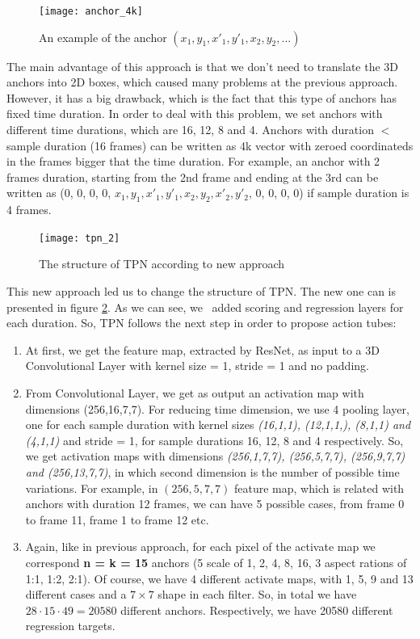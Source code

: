 \begin{figure}[h]
  \centering
  \texttt{[image: anchor\_4k]}
  \caption{An example of the anchor $(x_1,y_1,x'_1,y'_1,x_2,y_2, ...)$}
  \label{fig:anchor_4k}
\end{figure}

The main advantage of this approach is that we don't need to translate the 3D anchors into 2D boxes, which caused many problems at the previous approach.
However, it has a big drawback, which is the fact that this type of anchors has fixed time duration.
In order to deal with this problem, we set anchors with different time durations, which are 16, 12, 8 and 4.
Anchors with duration $ < $ sample duration (16 frames) can be written as 4k vector with zeroed coordinateds in the frames bigger that the time duration. For example, an anchor with
2 frames duration, starting from the 2nd frame and ending at the 3rd can be written as (0, 0, 0, 0, $x_1, y_1, x'_1, y'_1, x_2, y_2, x'_2, y'_2$, 0, 0, 0, 0) if sample
duration is 4 frames. 

\begin{figure}[h]
  \centering
  \texttt{[image: tpn\_2]}
  \caption{The structure of TPN according to new approach}
  \label{fig:New_structure}
\end{figure}

This new approach led us to change the structure of TPN. The new one can is presented in figure \ref{fig:New_structure}. As we can see, we \
added scoring and regression layers for each duration. So, TPN follows the next step in order to propose action tubes:
\begin{enumerate}
\item At first, we get the feature map, extracted by ResNet, as input to a 3D Convolutional Layer with kernel size = 1, stride = 1 and no padding.
\item From Convolutional Layer, we get as output an activation map with dimensions (256,16,7,7). For reducing time dimension, we use 4 pooling layer,
  one for each sample duration with kernel sizes \textit{(16,1,1), (12,1,1,), (8,1,1) and (4,1,1)} and stride = 1,  for sample durations 16, 12, 8 and 4 respectively.
  So, we get activation maps with dimensions \textit{(256,1,7,7), (256,5,7,7), (256,9,7,7) and (256,13,7,7)}, in which second dimension is the number of possible
  time variations. For example, in $(256,5,7,7)$ feature map, which is related with anchors with duration 12 frames, we can have 5 possible cases, from frame 0 to frame
  11, frame 1 to frame 12 etc.
  
\item Again, like in previous approach, for each pixel of the activate map we correspond \textbf{n = k = 15}
  anchors (5 scale of 1, 2, 4, 8, 16, 3 aspect rations of  1:1, 1:2, 2:1). Of course, we have 4 different activate maps, with 1, 5, 9 and 13
  different cases and a $7 \times 7$ shape in each filter. So, in total we have $28 \cdot 15 \cdot 49 = 20580$ different anchors.
  Respectively, we have 20580 different regression targets.

\end{enumerate}

